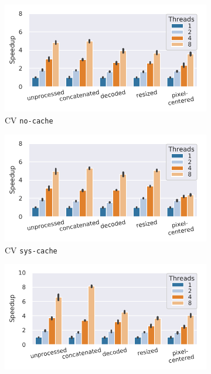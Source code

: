 {\begin{figure}
    \begin{subfigure}[c]{0.22\textwidth}
        \includegraphics[width=\textwidth]{figures/imagenet-pipeline/speedup-8000-samples-epoch-0.pdf}
        \vspace{-18pt}
        \caption{CV \texttt{no-cache}}
        \label{fig:speedup-cv}
    \end{subfigure}
    \begin{subfigure}[c]{0.22\textwidth}
        \includegraphics[width=\textwidth]{figures/imagenet-pipeline/speedup-8000-samples-epoch-1.pdf}
        \vspace{-18pt}
        \caption{CV \texttt{sys-cache}}
        \label{fig:speedup-epochs-cv}
    \end{subfigure}
    \begin{subfigure}[c]{0.22\textwidth}
        \includegraphics[width=\textwidth]{figures/cubeplusplus-jpg-pipeline/speedup-4890-samples-epoch-0.pdf}

\end{subfigure}
\end{figure}}
